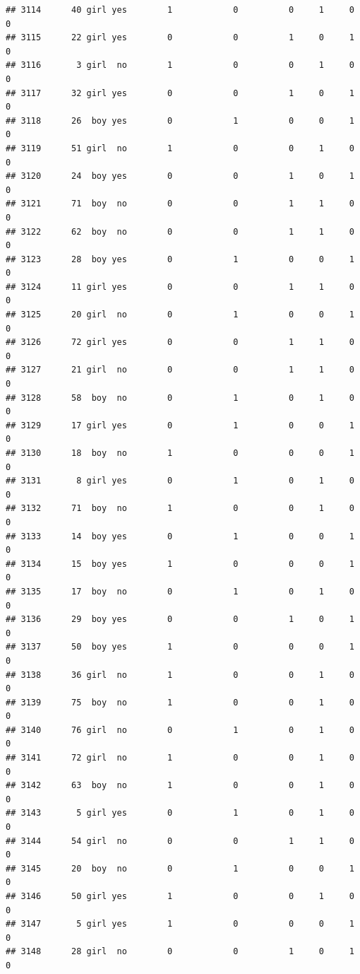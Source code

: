 \documentclass[man]{apa6}
\begin{document}
\begin{verbatim}
## 3114      40 girl yes        1            0          0     1     0     0
## 3115      22 girl yes        0            0          1     0     1     0
## 3116       3 girl  no        1            0          0     1     0     0
## 3117      32 girl yes        0            0          1     0     1     0
## 3118      26  boy yes        0            1          0     0     1     0
## 3119      51 girl  no        1            0          0     1     0     0
## 3120      24  boy yes        0            0          1     0     1     0
## 3121      71  boy  no        0            0          1     1     0     0
## 3122      62  boy  no        0            0          1     1     0     0
## 3123      28  boy yes        0            1          0     0     1     0
## 3124      11 girl yes        0            0          1     1     0     0
## 3125      20 girl  no        0            1          0     0     1     0
## 3126      72 girl yes        0            0          1     1     0     0
## 3127      21 girl  no        0            0          1     1     0     0
## 3128      58  boy  no        0            1          0     1     0     0
## 3129      17 girl yes        0            1          0     0     1     0
## 3130      18  boy  no        1            0          0     0     1     0
## 3131       8 girl yes        0            1          0     1     0     0
## 3132      71  boy  no        1            0          0     1     0     0
## 3133      14  boy yes        0            1          0     0     1     0
## 3134      15  boy yes        1            0          0     0     1     0
## 3135      17  boy  no        0            1          0     1     0     0
## 3136      29  boy yes        0            0          1     0     1     0
## 3137      50  boy yes        1            0          0     0     1     0
## 3138      36 girl  no        1            0          0     1     0     0
## 3139      75  boy  no        1            0          0     1     0     0
## 3140      76 girl  no        0            1          0     1     0     0
## 3141      72 girl  no        1            0          0     1     0     0
## 3142      63  boy  no        1            0          0     1     0     0
## 3143       5 girl yes        0            1          0     1     0     0
## 3144      54 girl  no        0            0          1     1     0     0
## 3145      20  boy  no        0            1          0     0     1     0
## 3146      50 girl yes        1            0          0     1     0     0
## 3147       5 girl yes        1            0          0     0     1     0
## 3148      28 girl  no        0            0          1     0     1     0

\end{verbatim}
\end{document}
